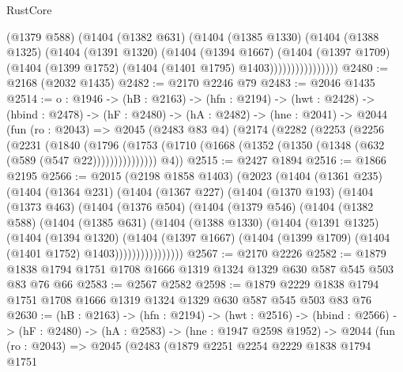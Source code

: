 \begin{lexlean}{RustCore}
\begin{coremodule}
                    (@1379 @588)
                    (@1404
                      (@1382 @631)
                      (@1404
                        (@1385 @1330)
                        (@1404
                          (@1388 @1325)
                          (@1404
                            (@1391 @1320)
                            (@1404
                              (@1394 @1667)
                              (@1404
                                (@1397 @1709)
                                (@1404 (@1399 @1752) (@1404 (@1401 @1795) @1403))))))))))))))))
@2480 := @2168 (@2032 @1435)
@2482 := @2170 @2246 @79
@2483 := @2046 @1435
@2514 := {o : @1946} ->
  (hB : @2163) ->
  (hfn : @2194) ->
  (hwt : @2428) ->
  (hbind : @2478) ->
  (hF : @2480) ->
  (hA : @2482) ->
  (hne : @2041) ->
  @2044
    (fun (ro : @2043) =>
    @2045
      (@2483 @83 @4)
      (@2174
        (@2282
          (@2253
            (@2256
              (@2231
                (@1840
                  (@1796
                    (@1753 (@1710 (@1668 (@1352 (@1350 (@1348 (@632 (@589 (@547 @22)))))))))))))))
        @4))
@2515 := @2427 @1894
@2516 := @1866 @2195
@2566 := @2015
    (@2198 @1858 @1403)
    (@2023
      (@1404
        (@1361 @235)
        (@1404
          (@1364 @231)
          (@1404
            (@1367 @227)
            (@1404
              (@1370 @193)
              (@1404
                (@1373 @463)
                (@1404
                  (@1376 @504)
                  (@1404
                    (@1379 @546)
                    (@1404
                      (@1382 @588)
                      (@1404
                        (@1385 @631)
                        (@1404
                          (@1388 @1330)
                          (@1404
                            (@1391 @1325)
                            (@1404
                              (@1394 @1320)
                              (@1404
                                (@1397 @1667)
                                (@1404 (@1399 @1709) (@1404 (@1401 @1752) @1403))))))))))))))))
@2567 := @2170 @2226
@2582 := @1879 @1838 @1794 @1751 @1708 @1666 @1319 @1324 @1329 @630 @587 @545 @503 @83 @76 @66
@2583 := @2567 @2582
@2598 := @1879 @2229 @1838 @1794 @1751 @1708 @1666 @1319 @1324 @1329 @630 @587 @545 @503 @83 @76
@2630 := (hB : @2163) ->
  (hfn : @2194) ->
  (hwt : @2516) ->
  (hbind : @2566) ->
  (hF : @2480) ->
  (hA : @2583) ->
  (hne : @1947 @2598 @1952) ->
  @2044
    (fun (ro : @2043) =>
    @2045
      (@2483
        (@1879
          @2251
          @2254
          @2229
          @1838
          @1794
          @1751

\end{coremodule}
\end{lexlean}
